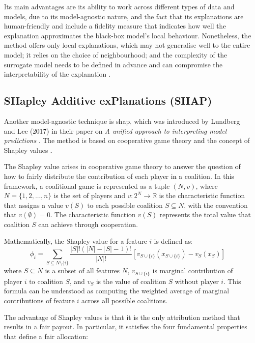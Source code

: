Its main advantages are its ability to work across different types of data and models, due to its model-agnostic nature, and the fact that its explanations are human-friendly and include a fidelity measure that indicates how well the explanation approximates the black-box model's local behaviour. Nonetheless, the method offers only local explanations, which may not generalise well to the entire model; it relies on the choice of neighbourhood; and the complexity of the surrogate model needs to be defined in advance and can compromise the interpretability of the explanation \cite{Molnar2025}.

\subsection{SHapley Additive exPlanations (SHAP)} \label{sec:shap}

Another model-agnostic technique is \acrfull{shap}, which was introduced by Lundberg and Lee (2017) in their paper on \textit{A unified approach to interpreting model predictions} \cite{Lundberg2017}. The method is based on cooperative game theory and the concept of Shapley values \cite{Shapley1953}.

The Shapley value arises in cooperative game theory to answer the question of how to fairly distribute the contribution of each player in a coalition. In this framework, a coalitional game is represented as a tuple $(N,v)$, where $N = \{1, 2, \ldots, n\}$ is the set of players and $v: 2^N \rightarrow \mathbb{R}$ is the characteristic function that assigns a value $v(S)$ to each possible coalition $S \subseteq N$, with the convention that $v(\emptyset) = 0$. The characteristic function $v(S)$ represents the total value that coalition $S$ can achieve through cooperation. 

Mathematically, the Shapley value for a feature $i$ is defined as:
\begin{equation}
    \phi_i = \sum_{S \subseteq N \setminus \{i\}} \frac{|S|! (|N| - |S| - 1)!}{|N|!} \left[ v_{S \cup \{i\}}(x_{S \cup \{i\}}) - v_S(x_S) \right]
\end{equation}
where $S \subseteq N$ is a subset of all features $N$, $v_{S \cup \{i\}}$ is marginal contribution of player $i$ to coalition $S$, and $v_S$ is the value of coalition $S$ without player $i$. This formula can be understood as computing the weighted average of marginal contributions of feature $i$ across all possible coalitions. 

The advantage of Shapley values is that it is the only attribution method that results in a fair payout. In particular, it satisfies the four fundamental properties that define a fair allocation: 

